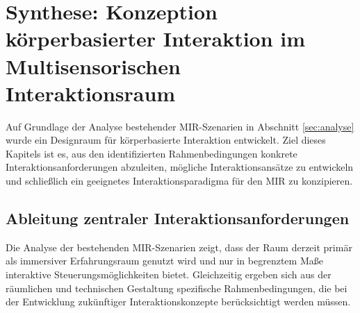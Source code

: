 \section{Synthese: Konzeption körper\-basierter Interaktion im Multisensorischen Interaktionsraum}
\label{sec:synthese}
Auf Grundlage der Analyse bestehender MIR-Szenarien in Abschnitt \ref{sec:analyse} wurde ein Designraum für körper\-basierte Interaktion entwickelt.
Ziel dieses Kapitels ist es, aus den identifizierten Rahmenbedingungen konkrete Interaktionsanforderungen abzuleiten, mögliche Interaktionsansätze zu entwickeln und schließlich ein geeignetes Interaktionsparadigma für den MIR zu konzipieren.


\subsection{Ableitung zentraler Interaktionsanforderungen}

Die Analyse der bestehenden MIR-Szenarien zeigt, dass der Raum derzeit primär als immersiver Erfahrungsraum genutzt wird und nur in begrenztem Maße interaktive Steuerungs\-möglichkeiten bietet. Gleichzeitig ergeben sich aus der räumlichen und technischen Gestaltung spezifische Rahmenbedingungen, die bei der Entwicklung zukünftiger Interaktionskonzepte berücksichtigt werden müssen.

